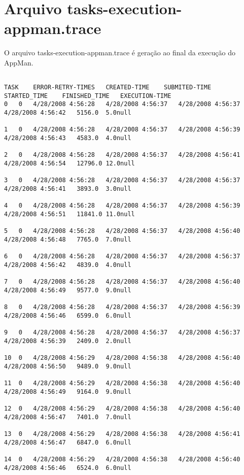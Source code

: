 \chapter{Arquivo tasks-execution-appman.trace}
\label{anexo:trace}

O arquivo tasks-execution-appman.trace é geração ao final da execução do AppMan.

\begin{scriptsize}
\begin{verbatim}

TASK	ERROR-RETRY-TIMES	CREATED-TIME	SUBMITED-TIME	STARTED_TIME	FINISHED_TIME	EXECUTION-TIME
0	0	4/28/2008 4:56:28	4/28/2008 4:56:37	4/28/2008 4:56:37	4/28/2008 4:56:42	5156.0	5.0null

1	0	4/28/2008 4:56:28	4/28/2008 4:56:37	4/28/2008 4:56:39	4/28/2008 4:56:43	4583.0	4.0null

2	0	4/28/2008 4:56:28	4/28/2008 4:56:37	4/28/2008 4:56:41	4/28/2008 4:56:54	12796.0	12.0null

3	0	4/28/2008 4:56:28	4/28/2008 4:56:37	4/28/2008 4:56:37	4/28/2008 4:56:41	3893.0	3.0null

4	0	4/28/2008 4:56:28	4/28/2008 4:56:37	4/28/2008 4:56:39	4/28/2008 4:56:51	11841.0	11.0null

5	0	4/28/2008 4:56:28	4/28/2008 4:56:37	4/28/2008 4:56:40	4/28/2008 4:56:48	7765.0	7.0null

6	0	4/28/2008 4:56:28	4/28/2008 4:56:37	4/28/2008 4:56:37	4/28/2008 4:56:42	4839.0	4.0null

7	0	4/28/2008 4:56:28	4/28/2008 4:56:37	4/28/2008 4:56:40	4/28/2008 4:56:49	9577.0	9.0null

8	0	4/28/2008 4:56:28	4/28/2008 4:56:37	4/28/2008 4:56:39	4/28/2008 4:56:46	6599.0	6.0null

9	0	4/28/2008 4:56:28	4/28/2008 4:56:37	4/28/2008 4:56:37	4/28/2008 4:56:39	2409.0	2.0null

10	0	4/28/2008 4:56:29	4/28/2008 4:56:38	4/28/2008 4:56:40	4/28/2008 4:56:50	9489.0	9.0null

11	0	4/28/2008 4:56:29	4/28/2008 4:56:38	4/28/2008 4:56:40	4/28/2008 4:56:49	9164.0	9.0null

12	0	4/28/2008 4:56:29	4/28/2008 4:56:38	4/28/2008 4:56:40	4/28/2008 4:56:47	7401.0	7.0null

13	0	4/28/2008 4:56:29	4/28/2008 4:56:38	4/28/2008 4:56:41	4/28/2008 4:56:47	6847.0	6.0null

14	0	4/28/2008 4:56:29	4/28/2008 4:56:38	4/28/2008 4:56:40	4/28/2008 4:56:46	6524.0	6.0null


\end{verbatim}
\end{scriptsize}
